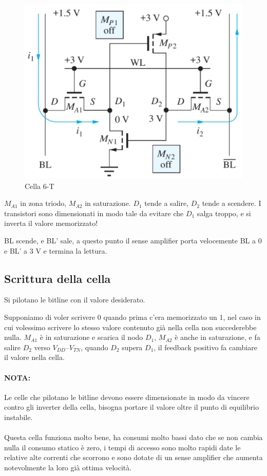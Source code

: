 \begin{figure}[htbp]
    \centering
    \includegraphics[width=0.4\linewidth]{img/cache1.png}
    \caption{Cella 6-T}
\end{figure}

$M_{A1}$ in zona triodo, $M_{A2}$ in saturazione. $D_1$ tende a salire, $D_2$ tende a scendere. I transistori sono dimensionati in modo tale da
evitare che $D_1$ salga troppo, e si inverta il valore memorizzato!

BL scende, e BL' sale, a questo punto il sense amplifier porta velocemente BL a 0 e BL' a 3 V e termina la lettura.


\subsection{Scrittura della cella}

Si pilotano le bitline con il valore desiderato. 

Supponiamo di voler scrivere 0 quando prima c'era memorizzato un 1, nel caso in cui volessimo scrivere lo stesso valore contenuto già nella cella non succederebbe nulla. $M_{A1}$ è in saturazione e scarica il nodo $D_1$, $M_{A2}$ è anche in saturazione, e fa salire $D_2$ verso $V_{DD} – V_{TN}$, quando $D_2$ supera $D_1$, il feedback positivo fa cambiare il valore nella cella.

\paragraph{NOTA:} Le celle che pilotano le bitline
devono essere dimensionate in
modo da vincere contro gli inverter
della cella, bisogna portare il valore oltre il punto di equilibrio instabile.


\paragraph{}
Questa cella funziona molto bene, ha consumi molto bassi dato che se non cambia nulla il consumo statico è zero, i tempi di accesso sono molto rapidi date le relative alte correnti che scorrono e sono dotate di un sense amplifier che aumenta notevolmente la loro già ottima velocità.

